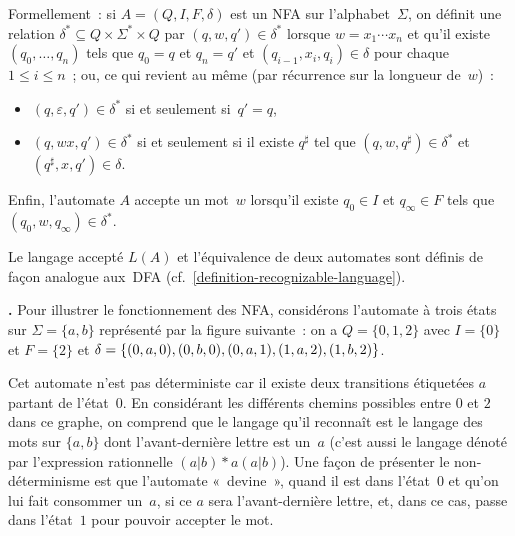 \documentclass[12pt,a4paper]{article}
\theoremstyle{definition}
\newcommand\thingy{%
\refstepcounter{comcnt}\medskip\noindent\textbf{\thecomcnt.} }
\begin{document}
Formellement : si $A = (Q,I,F,\delta)$ est un NFA sur
l'alphabet $\Sigma$, on définit une relation $\delta^* \subseteq Q
\times \Sigma^* \times Q$ par $(q,w,q') \in \delta^*$ lorsque $w =
x_1\cdots x_n$ et qu'il existe $(q_0,\ldots,q_n)$ tels que $q_0 = q$
et $q_n = q'$ et $(q_{i-1},x_i,q_i) \in \delta$ pour chaque $1\leq
i\leq n$ ; ou, ce qui revient au même (par récurrence sur la longueur
de $w$) :
\begin{itemize}
\item $(q,\varepsilon,q') \in \delta^*$ si et seulement si $q'=q$,
\item $(q,wx,q') \in \delta^*$ si et seulement si il existe $q^\sharp$
  tel que $(q,w,q^\sharp) \in \delta^*$ et $(q^\sharp,x,q') \in
  \delta$.
\end{itemize}

Enfin, l'automate $A$ accepte un mot $w$ lorsqu'il existe $q_0\in I$
et $q_\infty\in F$ tels que $(q_0,w,q_\infty) \in \delta^*$.

\smallskip

Le langage accepté $L(A)$ et l'équivalence de deux automates sont
définis de façon analogue aux DFA
(cf. \ref{definition-recognizable-language}).

\thingy\label{discussion-example4} Pour illustrer le fonctionnement
des NFA, considérons l'automate à trois états sur $\Sigma=\{a,b\}$
représenté par la figure suivante : on a $Q = \{0,1,2\}$ avec
$I=\{0\}$ et $F=\{2\}$ et $\delta = \{(0,a,0),\penalty0
(0,b,0),\penalty-100 (0,a,1),\penalty-50 (1,a,2),\penalty0 (1,b,2)\}$.

\begin{center}


\end{center}

Cet automate n'est pas déterministe car il existe deux transitions
étiquetées $a$ partant de l'état $0$.  En considérant les différents
chemins possibles entre $0$ et $2$ dans ce graphe, on comprend que le
langage qu'il reconnaît est le langage des mots sur $\{a,b\}$ dont
l'avant-dernière lettre est un $a$ (c'est aussi le langage dénoté par
l'expression rationnelle $(a|b){*}a(a|b)$).  Une façon de présenter le
non-déterminisme est que l'automate « devine », quand il est dans
l'état $0$ et qu'on lui fait consommer un $a$, si ce $a$ sera
l'avant-dernière lettre, et, dans ce cas, passe dans l'état $1$ pour
pouvoir accepter le mot.
\end{document}
